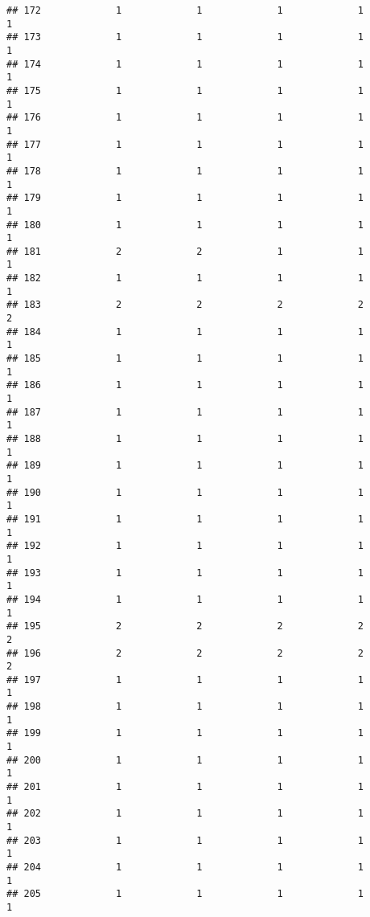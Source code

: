 \documentclass[
]{article}
\begin{document}
\begin{verbatim}
## 172             1             1             1             1             1
## 173             1             1             1             1             1
## 174             1             1             1             1             1
## 175             1             1             1             1             1
## 176             1             1             1             1             1
## 177             1             1             1             1             1
## 178             1             1             1             1             1
## 179             1             1             1             1             1
## 180             1             1             1             1             1
## 181             2             2             1             1             1
## 182             1             1             1             1             1
## 183             2             2             2             2             2
## 184             1             1             1             1             1
## 185             1             1             1             1             1
## 186             1             1             1             1             1
## 187             1             1             1             1             1
## 188             1             1             1             1             1
## 189             1             1             1             1             1
## 190             1             1             1             1             1
## 191             1             1             1             1             1
## 192             1             1             1             1             1
## 193             1             1             1             1             1
## 194             1             1             1             1             1
## 195             2             2             2             2             2
## 196             2             2             2             2             2
## 197             1             1             1             1             1
## 198             1             1             1             1             1
## 199             1             1             1             1             1
## 200             1             1             1             1             1
## 201             1             1             1             1             1
## 202             1             1             1             1             1
## 203             1             1             1             1             1
## 204             1             1             1             1             1
## 205             1             1             1             1             1

\end{verbatim}
\end{document}
